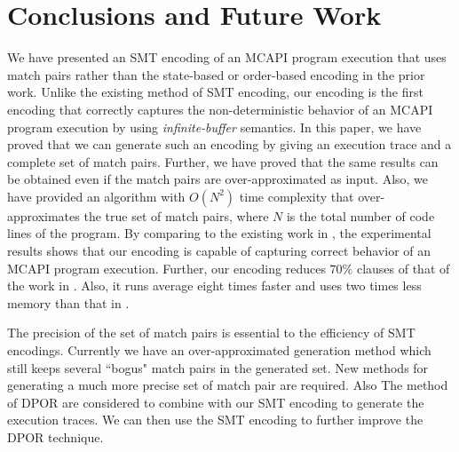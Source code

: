 \section{Conclusions and Future Work}
We have presented an SMT encoding of an MCAPI program execution that uses match pairs rather than the state-based or order-based encoding in the prior work. Unlike the existing method of SMT encoding, our encoding is the first encoding that correctly captures the non-deterministic behavior of an MCAPI program execution by using \textit{infinite-buffer} semantics. In this paper, we have proved that we can generate such an encoding by giving an execution trace and a complete set of match pairs. Further, we have proved that the same results can be obtained even if the match pairs are over-approximated as input. Also, we have provided an algorithm with $O(N^2)$ time complexity that over-approximates the true set of match pairs, where $N$ is the total number of code lines of the program. By comparing to the existing work in \cite{elwakil:padtad10}, the experimental results shows that our encoding is capable of capturing correct behavior of an MCAPI program execution. Further, our encoding reduces $70\%$ clauses of that of the work in \cite{elwakil:padtad10}. Also, it runs average eight times faster and uses two times less memory than that in \cite{elwakil:padtad10}.

The precision of the set of match pairs is essential to the efficiency of SMT encodings. Currently we have an over-approximated generation method which still keeps several ``bogus" match pairs in the generated set. New methods for generating a much more precise set of match pair are required. Also The method of DPOR are considered to combine with our SMT encoding to generate the execution traces. We can then use the SMT encoding to further improve the DPOR technique.

